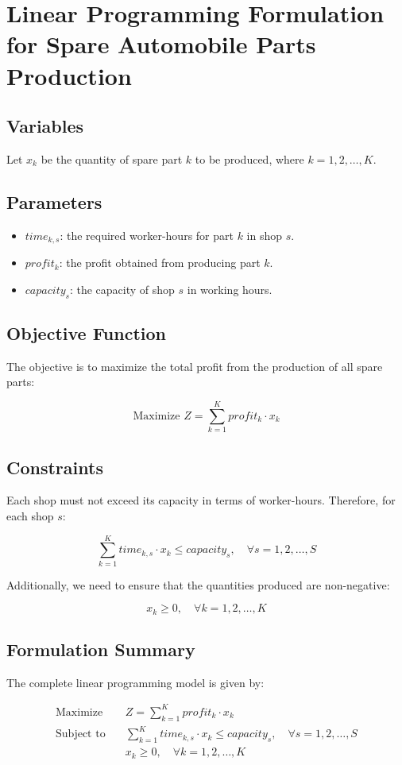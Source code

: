 \documentclass{article}
\begin{document}
\section*{Linear Programming Formulation for Spare Automobile Parts Production}

\subsection*{Variables}
Let \( x_k \) be the quantity of spare part \( k \) to be produced, where \( k = 1, 2, \ldots, K \).

\subsection*{Parameters}
\begin{itemize}
    \item \( time_{k, s} \): the required worker-hours for part \( k \) in shop \( s \).
    \item \( profit_k \): the profit obtained from producing part \( k \).
    \item \( capacity_s \): the capacity of shop \( s \) in working hours.
\end{itemize}

\subsection*{Objective Function}
The objective is to maximize the total profit from the production of all spare parts:

\[
\text{Maximize } Z = \sum_{k=1}^{K} profit_k \cdot x_k
\]

\subsection*{Constraints}
Each shop must not exceed its capacity in terms of worker-hours. Therefore, for each shop \( s \):

\[
\sum_{k=1}^{K} time_{k, s} \cdot x_k \leq capacity_s, \quad \forall s = 1, 2, \ldots, S
\]

Additionally, we need to ensure that the quantities produced are non-negative:

\[
x_k \geq 0, \quad \forall k = 1, 2, \ldots, K
\]

\subsection*{Formulation Summary}
The complete linear programming model is given by:

\begin{align*}
\text{Maximize} & \quad Z = \sum_{k=1}^{K} profit_k \cdot x_k \\
\text{Subject to} & \quad \sum_{k=1}^{K} time_{k, s} \cdot x_k \leq capacity_s, \quad \forall s = 1, 2, \ldots, S \\
                  & \quad x_k \geq 0, \quad \forall k = 1, 2, \ldots, K
\end{align*}
\end{document}
